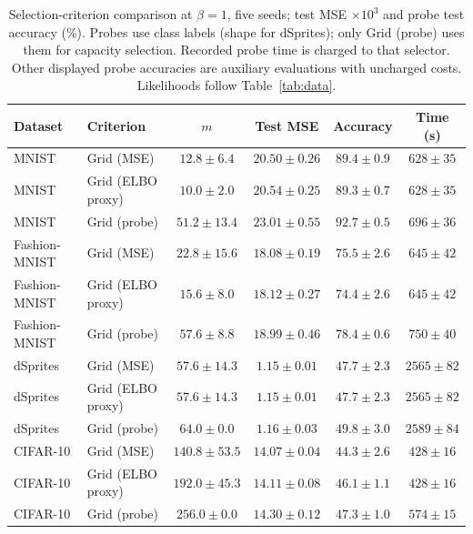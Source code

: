 \begin{table}[H]
\caption{Selection-criterion comparison at $\beta=1$, five seeds; test MSE $\times10^3$ and probe test accuracy (\%). Probes use class labels (shape for dSprites); only Grid (probe) uses them for capacity selection. Recorded probe time is charged to that selector. Other displayed probe accuracies are auxiliary evaluations with uncharged costs. Likelihoods follow Table~\ref{tab:data}.}\label{tab:selection}
\footnotesize
\setlength{\tabcolsep}{3.5pt}
\begin{tabular*}{\textwidth}{@{\extracolsep{\fill}}llcccc@{}}
\toprule
Dataset & Criterion & $m$ & Test MSE & Accuracy & Time (s) \\
\midrule
MNIST & Grid (MSE) & $12.8 \pm 6.4$ & $20.50 \pm 0.26$ & $89.4 \pm 0.9$ & $628 \pm 35$ \\
MNIST & Grid (ELBO proxy) & $10.0 \pm 2.0$ & $20.54 \pm 0.25$ & $89.3 \pm 0.7$ & $628 \pm 35$ \\
MNIST & Grid (probe) & $51.2 \pm 13.4$ & $23.01 \pm 0.55$ & $92.7 \pm 0.5$ & $696 \pm 36$ \\
Fashion-MNIST & Grid (MSE) & $22.8 \pm 15.6$ & $18.08 \pm 0.19$ & $75.5 \pm 2.6$ & $645 \pm 42$ \\
Fashion-MNIST & Grid (ELBO proxy) & $15.6 \pm 8.0$ & $18.12 \pm 0.27$ & $74.4 \pm 2.6$ & $645 \pm 42$ \\
Fashion-MNIST & Grid (probe) & $57.6 \pm 8.8$ & $18.99 \pm 0.46$ & $78.4 \pm 0.6$ & $750 \pm 40$ \\
dSprites & Grid (MSE) & $57.6 \pm 14.3$ & $1.15 \pm 0.01$ & $47.7 \pm 2.3$ & $2565 \pm 82$ \\
dSprites & Grid (ELBO proxy) & $57.6 \pm 14.3$ & $1.15 \pm 0.01$ & $47.7 \pm 2.3$ & $2565 \pm 82$ \\
dSprites & Grid (probe) & $64.0 \pm 0.0$ & $1.16 \pm 0.03$ & $49.8 \pm 3.0$ & $2589 \pm 84$ \\
CIFAR-10 & Grid (MSE) & $140.8 \pm 53.5$ & $14.07 \pm 0.04$ & $44.3 \pm 2.6$ & $428 \pm 16$ \\
CIFAR-10 & Grid (ELBO proxy) & $192.0 \pm 45.3$ & $14.11 \pm 0.08$ & $46.1 \pm 1.1$ & $428 \pm 16$ \\
CIFAR-10 & Grid (probe) & $256.0 \pm 0.0$ & $14.30 \pm 0.12$ & $47.3 \pm 1.0$ & $574 \pm 15$ \\
\bottomrule
\end{tabular*}
\end{table}
